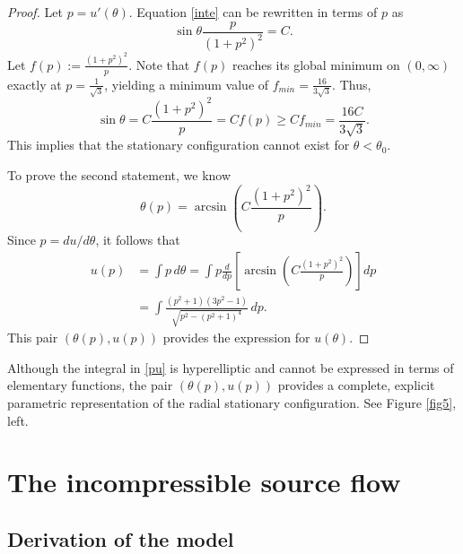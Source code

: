 \documentclass[a4paper,12pt]{amsart}
\theoremstyle{plain}
\theoremstyle{definition}
\begin{document}
\begin{proof}
Let $p = u'(\theta)$. Equation \eqref{inte} can be rewritten in terms of $p$ as
$$\sin\theta\frac{p}{(1+p^2)^2}=C.$$
Let $ f(p):=\frac{(1 + p^2)^2}{p}$. 
 Note that $f(p)$ reaches its global minimum on $(0, \infty)$ exactly at $p = \frac{1}{\sqrt{3}}$, yielding a minimum value of $f_{min} = \frac{16}{3\sqrt{3}}$. Thus, 
\begin{equation*}
 \sin\theta=C\frac{(1+p^2)^2}{p}=C f(p) \ge C f_{min} = \frac{16C}{3\sqrt{3}}.
\end{equation*}
This implies that the   stationary configuration cannot exist for $\theta < \theta_0$. 

To prove the second statement, we know
$$ \theta(p) = \arcsin\left( C \frac{(1+p^2)^2}{p} \right).$$
Since $p = du/d\theta$, it follows that 
\begin{equation} \label{pu}
\begin{split}
 u(p) &= \int p \, d\theta = \int p \frac{d}{dp}\left[ \arcsin\left( C \frac{(1+p^2)^2}{p} \right) \right] dp\\
 &=\int \frac{\left(p^2+1\right) \left(3 p^2-1\right)}{\sqrt{p^2-\left(p^2+1\right)^4}}\, dp.
 \end{split}
\end{equation}
This pair $(\theta(p), u(p))$ provides the expression for $u(\theta)$.
\end{proof}



Although the integral in \eqref{pu} is hyperelliptic and cannot 
be expressed in terms of elementary functions, the pair $(\theta(p), u(p))$ provides a complete, explicit parametric representation of the radial stationary configuration. See Figure \ref{fig5}, left.


\section{The incompressible source flow}\label{s3}

\subsection{Derivation of the model}
\end{document}
